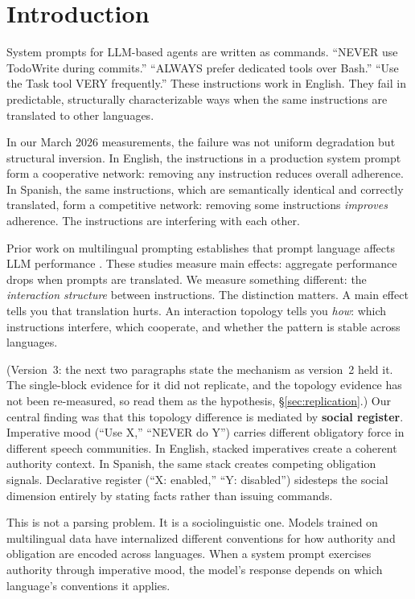 \documentclass[11pt,a4paper]{article}
\begin{document}
\section{Introduction}
\label{sec:introduction}

System prompts for LLM-based agents are written as commands. ``NEVER
use TodoWrite during commits.'' ``ALWAYS prefer dedicated tools over
Bash.'' ``Use the Task tool VERY frequently.'' These instructions work
in English. They fail in predictable, structurally characterizable
ways when the same instructions are translated to other languages.

In our March 2026 measurements, the failure was not uniform
degradation but structural inversion. In English, the instructions in a production system prompt form a
cooperative network: removing any instruction reduces overall
adherence. In Spanish, the same instructions, which are semantically
identical and correctly translated, form a competitive network: removing
some instructions \emph{improves} adherence. The instructions are
interfering with each other.

Prior work on multilingual prompting establishes that prompt language
affects LLM performance \citep{zhang2025crosslingual,
naacl2025translation, politeness2024}. These studies measure main
effects: aggregate performance drops when prompts are translated. We
measure something different: the \emph{interaction structure} between
instructions. The distinction matters. A main effect tells you that
translation hurts. An interaction topology tells you \emph{how}:
which instructions interfere, which cooperate, and whether the
pattern is stable across languages.

(Version~3: the next two paragraphs state the mechanism as version~2
held it. The single-block evidence for it did not replicate, and the
topology evidence has not been re-measured, so read them as the
hypothesis, \S\ref{sec:replication}.) Our central finding was that this
topology difference is mediated by \textbf{social register}. Imperative mood (``Use X,'' ``NEVER do
Y'') carries different obligatory force in different speech
communities. In English, stacked imperatives create a coherent
authority context. In Spanish, the same stack creates competing
obligation signals. Declarative register (``X: enabled,'' ``Y:
disabled'') sidesteps the social dimension entirely by stating facts
rather than issuing commands.

This is not a parsing problem. It is a sociolinguistic one. Models
trained on multilingual data have internalized different conventions
for how authority and obligation are encoded across languages. When a
system prompt exercises authority through imperative mood, the
model's response depends on which language's conventions it applies.
\end{document}
